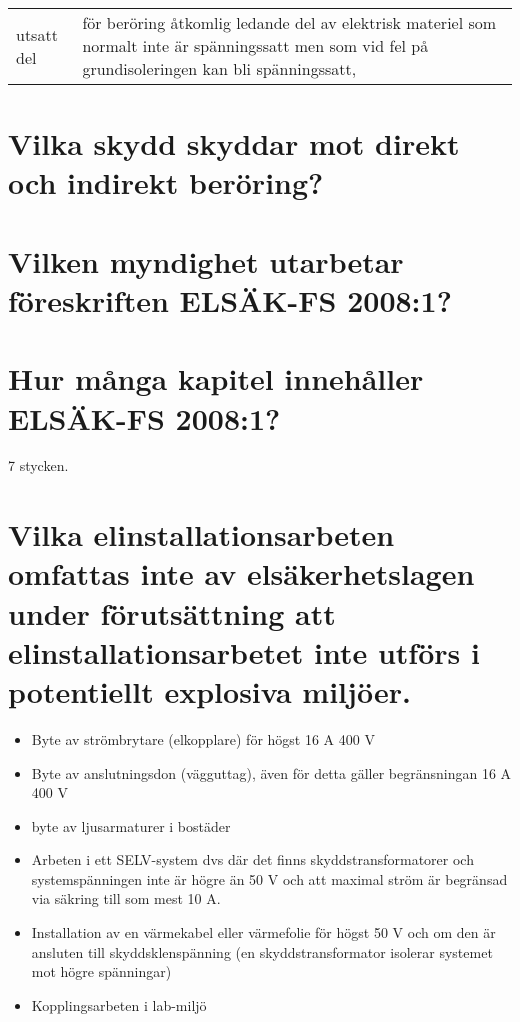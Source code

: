 \documentclass[a4paper,swedish]{article}
\begin{document}
\begin{center}
  \begin{tabular}{|l p{10cm}|}
    utsatt del & för beröring åtkomlig ledande del av elektrisk materiel
                 som normalt inte är spänningssatt men som vid fel på
                 grundisoleringen kan bli spänningssatt,
  \end{tabular}
\end{center}

\setcounter{section}{61}
\section{Vilka skydd skyddar mot direkt och indirekt beröring?}

\setcounter{section}{63}
\section{Vilken myndighet utarbetar föreskriften ELSÄK-FS 2008:1?}

\setcounter{section}{65}
\section{Hur många kapitel innehåller ELSÄK-FS 2008:1?}

7 stycken.

\setcounter{section}{67}
\section{Vilka elinstallationsarbeten omfattas inte av elsäkerhetslagen under förutsättning att elinstallationsarbetet inte utförs i potentiellt explosiva miljöer.}

\begin{itemize}
\item Byte av strömbrytare (elkopplare) för högst 16 A 400 V
\item Byte av anslutningsdon (vägguttag), även för detta gäller begränsningan 16 A 400 V
\item byte av ljusarmaturer i bostäder
\item Arbeten i ett SELV-system dvs där det finns skyddstransformatorer och systemspänningen inte är högre än 50 V
  och att maximal ström är begränsad via säkring till som mest 10 A.
\item Installation av en värmekabel eller värmefolie för högst 50 V och om den är ansluten till skyddsklenspänning (en skyddstransformator isolerar systemet mot högre spänningar)
\item Kopplingsarbeten i lab-miljö
\end{itemize}
\end{document}
